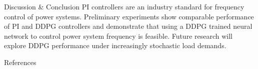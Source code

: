 \documentclass[final]{beamer}
\newlength{\onecolwid}
\begin{document}
\begin{frame}[t]
\begin{columns}[t]
\begin{column}{\onecolwid}
\begin{block}{Discussion \& Conclusion}
PI controllers are an industry standard for frequency control of power systems. Preliminary experiments show comparable performance of PI and DDPG controllers and demonstrate that using a DDPG trained neural network to control power system frequency is feasible. Future research will explore DDPG performance under increasingly stochastic load demands.
\end{block}

\vspace{-1cm}
\begin{block}{References}

\tiny{\printbibliography}

\end{block}


\end{column} %

\end{columns} %

\end{frame} %
\end{document}
